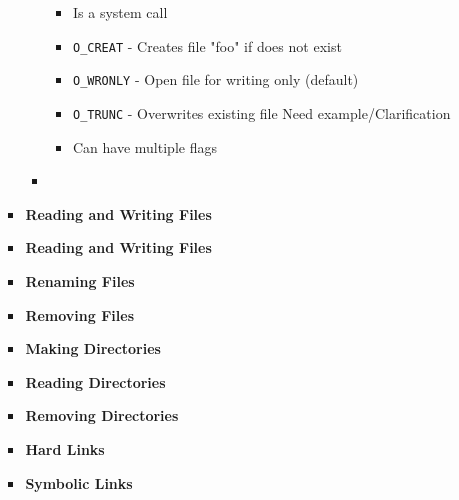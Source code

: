 \documentclass[12pt]{article}
\begin{document}
\begin{enumerate}[1.]
\begin{enumerate}[a)]
\begin{itemize}
\begin{itemize}
                \begin{itemize}
                    \item Is a system call
                    \item \texttt{O\_CREAT} - Creates file "foo" if does not exist
                    \item \texttt{O\_WRONLY} - Open file for writing only (default)
                    \item \texttt{O\_TRUNC} - Overwrites existing file \color{red}Need example/Clarification\color{black}
                    \item Can have multiple flags
                \end{itemize}
                \item
            \end{itemize}
            \item \textbf{Reading and Writing Files}
            \item \textbf{Reading and Writing Files}
            \item \textbf{Renaming Files}
            \item \textbf{Removing Files}
            \item \textbf{Making Directories}
            \item \textbf{Reading Directories}
            \item \textbf{Removing Directories}
            \item \textbf{Hard Links}
            \item \textbf{Symbolic Links}
        \end{itemize}

    \end{enumerate}
\end{enumerate}
\end{document}

